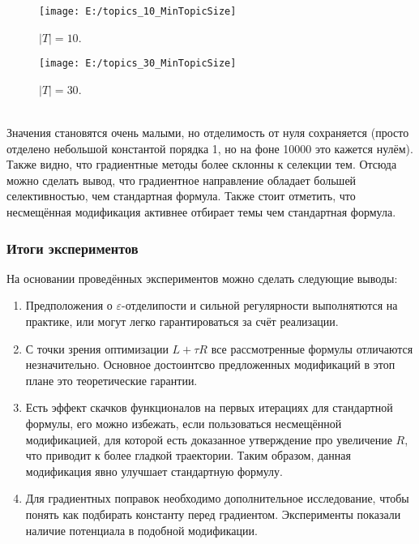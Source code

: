 \documentclass[12pt]{article}
\begin{document}
\begin{figure}[H]
	\centering
	\caption{$|T| = 10$.}    
	\texttt{[image: E:/topics\_10\_MinTopicSize]}
\end{figure}

\begin{figure}[H]
	\centering
	\caption{$|T| = 30$.}    
	\texttt{[image: E:/topics\_30\_MinTopicSize]}
\end{figure}
\ \\
Значения становятся очень малыми, но отделимость от нуля сохраняется (просто отделено небольшой константой порядка 1, но на фоне 10000 это кажется нулём). \\
Также видно, что градиентные методы более склонны к селекции тем. Отсюда можно сделать вывод, что градиентное направление обладает большей селективностью, чем стандартная формула. Также стоит отметить, что несмещённая модификация активнее отбирает темы чем стандартная формула.
\subsubsection{Итоги экспериментов}
На основании проведённых экспериментов можно сделать следующие выводы:
\begin{enumerate}
\item Предположения о $\varepsilon$-отделипости и сильной регулярности выполнятются на практике, или могут легко гарантироваться за счёт реализации.
\item С точки зрения оптимизации $L + \tau R$ все рассмотренные формулы отличаются незначительно. Основное достоинтсво предложенных модификаций в этоп плане это теоретические гарантии.
\item Есть эффект скачков функционалов на первых итерациях для стандартной формулы, его можно избежать, если пользоваться несмещённой модификацией, для которой есть доказанное утверждение про увеличение $R$, что приводит к более гладкой траектории. Таким образом, данная модификация явно улучшает стандартную формулу.
\item Для градиентных поправок необходимо дополнительное исследование, чтобы понять как подбирать константу перед градиентом. Эксперименты показали наличие потенциала в подобной модификации.
\end{enumerate}
\end{document}
